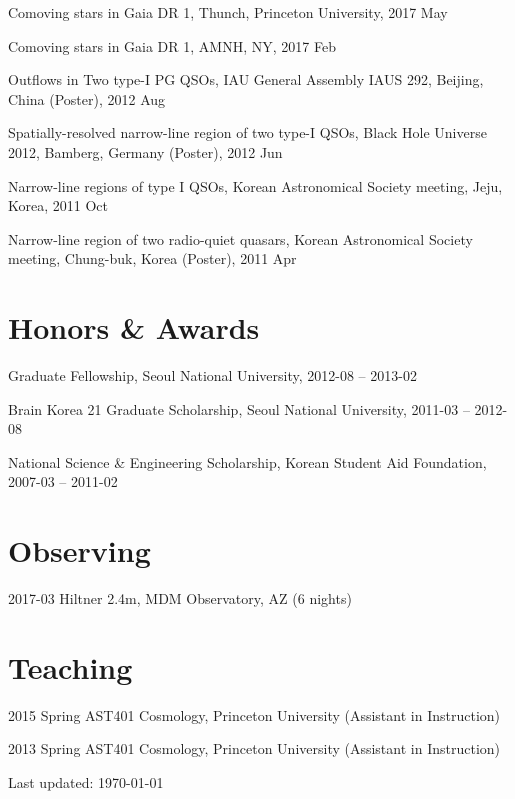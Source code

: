 \documentclass[11pt,letterpaper]{article}
\renewenvironment{itemize}{
  \begin{list}{}{
    \setlength{\leftmargin}{1.5em}
  }
}{
  \end{list}
}
\begin{document}
\begin{itemize}
  \setlength{\itemsep}{0em}

  \item Comoving stars in Gaia DR 1, Thunch, Princeton University, 2017 May
  \item Comoving stars in Gaia DR 1, AMNH, NY, 2017 Feb
  \item Outflows in Two type-I PG QSOs, IAU General Assembly IAUS 292, Beijing, China (Poster), 2012 Aug
  \item Spatially-resolved narrow-line region of two type-I QSOs, Black Hole Universe 2012, Bamberg, Germany (Poster), 2012 Jun
  \item Narrow-line regions of type I QSOs, Korean Astronomical Society meeting, Jeju, Korea, 2011 Oct
  \item Narrow-line region of two radio-quiet quasars, Korean Astronomical Society meeting, Chung-buk, Korea (Poster), 2011 Apr
\end{itemize}

\section*{Honors \& Awards}

\begin{itemize}
  \setlength{\itemsep}{0em}

  \item Graduate Fellowship, Seoul National University, 2012-08 -- 2013-02
  \item Brain Korea 21 Graduate Scholarship, Seoul National University, 2011-03 -- 2012-08
	\item National Science \& Engineering Scholarship, Korean Student Aid Foundation, 2007-03 -- 2011-02
\end{itemize}

\section*{Observing}
\begin{itemize}
  \item 2017-03 Hiltner 2.4m, MDM Observatory, AZ (6 nights)
\end{itemize}

\section*{Teaching}

\begin{itemize}
  \setlength\itemsep{0em}
  \item 2015 Spring AST401 Cosmology, Princeton University (Assistant in Instruction)
  \item 2013 Spring AST401 Cosmology, Princeton University (Assistant in Instruction)
\end{itemize}

\bigskip

\begin{center}
  \begin{footnotesize}
    Last updated: \today \\
  \end{footnotesize}
\end{center}
\end{document}
